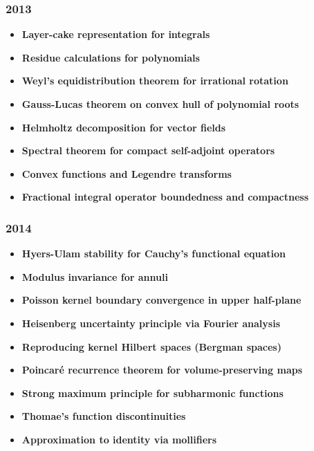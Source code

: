 \subsubsection*{2013}
\begin{itemize}
    \item \textbf{Layer-cake representation for integrals}
    \item \textbf{Residue calculations for polynomials}
    \item \textbf{Weyl's equidistribution theorem for irrational rotation}
    \item \textbf{Gauss-Lucas theorem on convex hull of polynomial roots}
    \item \textbf{Helmholtz decomposition for vector fields}
    \item \textbf{Spectral theorem for compact self-adjoint operators}
    \item \textbf{Convex functions and Legendre transforms}
    \item \textbf{Fractional integral operator boundedness and compactness}
\end{itemize}

\subsubsection*{2014}
\begin{itemize}
    \item \textbf{Hyers-Ulam stability for Cauchy's functional equation}
    \item \textbf{Modulus invariance for annuli}
    \item \textbf{Poisson kernel boundary convergence in upper half-plane}
    \item \textbf{Heisenberg uncertainty principle via Fourier analysis}
    \item \textbf{Reproducing kernel Hilbert spaces (Bergman spaces)}
    \item \textbf{Poincar\'e recurrence theorem for volume-preserving maps}
    \item \textbf{Strong maximum principle for subharmonic functions}
    \item \textbf{Thomae's function discontinuities}
    \item \textbf{Approximation to identity via mollifiers}
\end{itemize}


